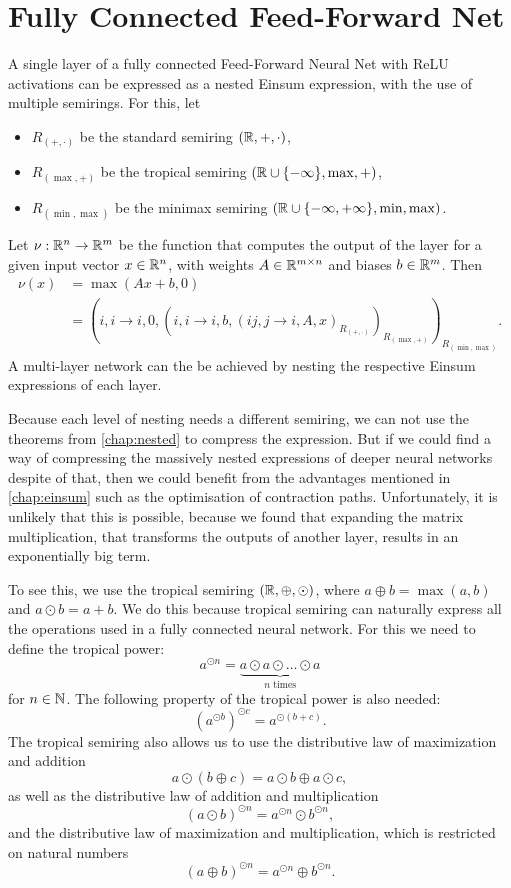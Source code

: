 \section{Fully Connected Feed-Forward Net}
A single layer of a fully connected Feed-Forward Neural Net with ReLU activations can be expressed as a nested Einsum expression, with the use of multiple semirings.
For this, let
\begin{itemize}
    \item $R_{(+, \cdot)}$ be the standard semiring $(\mathbb{R}, +, \cdot)$,
    \item $R_{(\max, +)}$ be the tropical semiring $(\mathbb{R} \cup \lbrace -\infty \rbrace, \max, +)$,
    \item $R_{(\min, \max)}$ be the minimax semiring $(\mathbb{R} \cup \lbrace -\infty, +\infty \rbrace, \min, \max)$.
\end{itemize}
Let $\nu: \mathbb{R}^n \rightarrow \mathbb{R}^m$ be the function that computes the output of the layer for a given input vector $x \in \mathbb{R}^n$, with weights $A \in \mathbb{R}^{m \times n}$ and biases $b \in \mathbb{R}^m$.
Then
\begin{align*}
    \nu(x) & = \max(Ax + b, 0)                                                                                                                   \\
           & = (i,i\rightarrow i, 0, (i,i \rightarrow i, b, (ij, j \rightarrow i, A, x)_{R_{(+, \cdot)}} )_{R_{(\max, +)}} )_{R_{(\min, \max)}}.
\end{align*}
A multi-layer network can the be achieved by nesting the respective Einsum expressions of each layer.

Because each level of nesting needs a different semiring, we can not use the theorems from \autoref{chap:nested} to compress the expression.
But if we could find a way of compressing the massively nested expressions of deeper neural networks despite of that, then we could benefit from the advantages mentioned in \autoref{chap:einsum} such as the optimisation of contraction paths.
Unfortunately, it is unlikely that this is possible, because we found that expanding the matrix multiplication, that transforms the outputs of another layer, results in an exponentially big term.

To see this, we use the tropical semiring $(\mathbb{R}, \oplus, \odot)$, where $a \oplus b = \max(a,b)$ and $a \odot b = a + b$.
We do this because tropical semiring can naturally express all the operations used in a fully connected neural network.
For this we need to define the tropical power:
$$a^{\odot n} = \underbrace{a \odot a \odot \ldots \odot a}_{n \text{ times}}$$
for $n \in \mathbb{N}$. The following property of the tropical power is also needed:
$$\left(a^{\odot b}\right)^{\odot c} = a^{\odot(b + c)}.$$
The tropical semiring also allows us to use the distributive law of maximization and addition
$$a \odot (b \oplus c) = a \odot b \oplus a \odot c,$$
as well as the distributive law of addition and multiplication
$$(a \odot b)^{\odot n} = a^{\odot n} \odot b^{\odot n},$$
and the distributive law of maximization and multiplication, which is restricted on natural numbers
$$(a \oplus b)^{\odot n} = a^{\odot n} \oplus b^{\odot n}.$$

